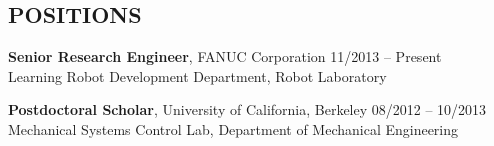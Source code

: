 \documentclass{res}
\begin{document}
\begin{resume}
\section{POSITIONS}
\vspace{0.1in}
\begin{list}{}{\setlength\leftmargin{0in}\setlength\topsep{0.15in}}
\item {\bf Senior Research Engineer}, FANUC Corporation \hfill 11/2013 -- Present\\
Learning Robot Development Department, Robot Laboratory

\item    {\bf Postdoctoral Scholar}, University of California, Berkeley    \hfill 08/2012 -- 10/2013\\
Mechanical Systems Control Lab, Department of Mechanical Engineering






\end{list}


\end{resume}
\end{document}
